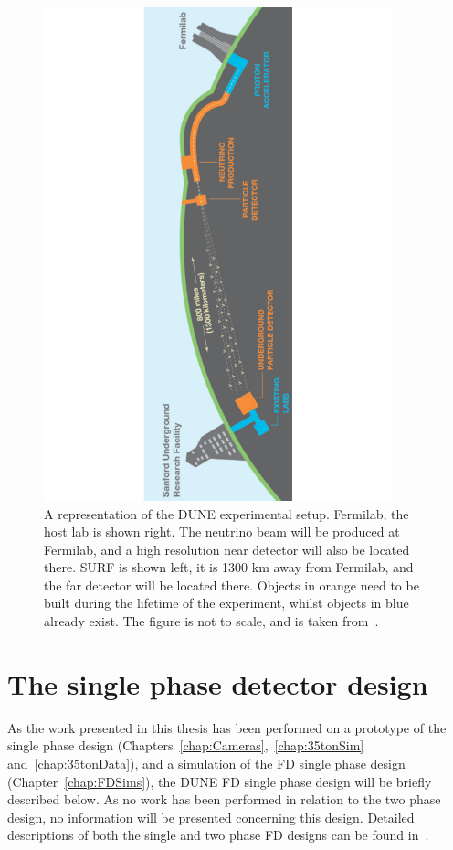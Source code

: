 \begin{figure}
  \centering
  \includegraphics[width=0.9\textwidth]{DUNESchematic}
  \caption[A representation of the DUNE experimental setup]
          {A representation of the DUNE experimental setup. Fermilab, the host lab is shown right. The neutrino beam will be produced at Fermilab, and a high resolution near detector will also be located there. SURF is shown left, it is 1300 km away from Fermilab, and the far detector will be located there. Objects in orange need to be built during the lifetime of the experiment, whilst objects in blue already exist. The figure is not to scale, and is taken from~\citep{DUNECDR_V1}.}
  \label{fig:DUNESchematic}
\end{figure}

\section{The single phase detector design} \label{sec:DUNEDetector_SP}
As the work presented in this thesis has been performed on a prototype of the single phase design (Chapters~\ref{chap:Cameras},~\ref{chap:35tonSim} and~\ref{chap:35tonData}), and a simulation of the FD single phase design (Chapter~\ref{chap:FDSims}), the DUNE FD single phase design will be briefly described below. As no work has been performed in relation to the two phase design, no information will be presented concerning this design. Detailed descriptions of both the single and two phase FD designs can be found in~\citep{DUNECDR_V4}. \\

